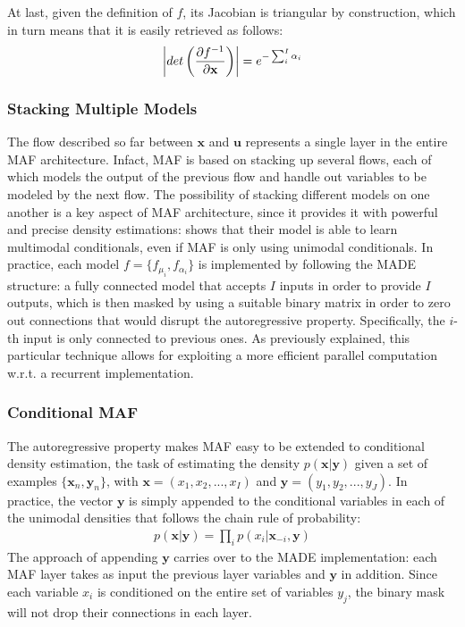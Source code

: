             \\\\
            At last, given the definition of $f$, its Jacobian is triangular by construction, which in turn means that it is easily retrieved as follows:
            \begin{align}
                \abs*{ det \left( \frac{\partial f^{-1}}{\partial \mathbf{x}} \right) } = e^{-\sum_{i}^{I} \alpha_i}
            \end{align}
            
            \subsubsection{Stacking Multiple Models}
                The flow described so far between $\mathbf{x}$ and $\mathbf{u}$ represents a single layer in the entire MAF architecture. Infact, MAF is based on stacking up several flows, each of which models the output of the previous flow and handle out variables to be modeled by the next flow. The possibility of stacking different models on one another is a key aspect of MAF architecture, since it provides it with powerful and precise density estimations:  shows that their model is able to learn multimodal conditionals, even if MAF is only using unimodal conditionals. \newline
                In practice, each model $f = \{ f_{\mu_i}, f_{\alpha_i} \}$ is implemented by following the MADE structure: a fully connected model that accepts $I$ inputs in order to provide $I$ outputs, which is then masked by using a suitable binary matrix in order to zero out connections that would disrupt the autoregressive property. Specifically, the $i$-th input is only connected to previous ones. As previously explained, this particular technique allows for exploiting a more efficient parallel computation w.r.t. a recurrent implementation.
                
            \subsubsection{Conditional MAF}
                The autoregressive property makes MAF easy to be extended to conditional density estimation, the task of estimating the density $p(\mathbf{x}\vert\mathbf{y})$ given a set of examples $\{ \mathbf{x}_n, \mathbf{y}_n\}$, with $\mathbf{x} = (x_1, x_2, ..., x_I)$ and $\mathbf{y} = (y_1, y_2, ..., y_J)$. In practice, the vector $\mathbf{y}$ is simply appended to the conditional variables in each of the unimodal densities that follows the chain rule of probability:
                \begin{align}
                    p(\mathbf{x}\vert\mathbf{y}) = \prod_{i} p(x_i \vert \mathbf{x}_{-i}, \mathbf{y})
                \end{align}
                The approach of appending $\mathbf{y}$ carries over to the MADE implementation: each MAF layer takes as input the previous layer variables and $\mathbf{y}$ in addition. Since each variable $x_i$ is conditioned on the entire set of variables $y_j$, the binary mask will not drop their connections in each layer.
    
    